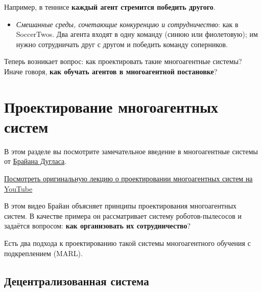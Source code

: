 \documentclass[11pt,a4paper]{article}
\begin{document}
Например, в теннисе \textbf{каждый агент стремится победить другого}.


\begin{itemize}
\tightlist
\item
  \emph{Смешанные среды, сочетающие конкуренцию и сотрудничество}: как в SoccerTwos. Два агента входят в одну команду (синюю или фиолетовую); им нужно сотрудничать друг с другом и победить команду соперников.
\end{itemize}


Теперь возникает вопрос: как проектировать такие многоагентные системы? Иначе говоря, \textbf{как обучать агентов в многоагентной постановке}?

\section{Проектирование многоагентных систем}\label{designing-multi-agents-systems}

В этом разделе вы посмотрите замечательное введение в многоагентные системы от \href{https://www.youtube.com/channel/UCq0imsn84ShAe9PBOFnoIrg}{Брайана Дугласа}.

\href{https://www.youtube.com/watch?v=qgb0gyrpiGk}{Посмотреть оригинальную лекцию о проектировании многоагентных систем на YouTube}

В этом видео Брайан объясняет принципы проектирования многоагентных систем. В качестве примера он рассматривает систему роботов-пылесосов и задаётся вопросом: \textbf{как организовать их сотрудничество}?

Есть два подхода к проектированию такой системы многоагентного обучения с подкреплением (MARL).

\subsection{Децентрализованная система}\label{decentralized-system}

\end{document}
